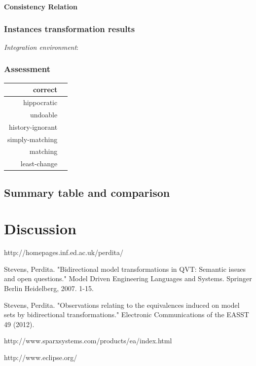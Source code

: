 \documentclass{article}
\begin{document}
\textbf{Consistency Relation}
\subsubsection{Instances transformation results}
\textit{Integration environment}:
~\\


\subsubsection{Assessment}

\begin{center}
\begin{tabular}{| r | c |}
  \hline                        
  correct & \\
  \hline
  hippocratic & \\
  \hline 
  undoable & \\
  \hline 
  history-ignorant & \\
  \hline 
  simply-matching & \\
  \hline 
  matching & \\
  \hline 
  least-change & \\
  \hline   
\end{tabular}
\end{center}
\pagebreak
\subsection{Summary table and comparison}

\pagebreak
\section{Discussion}

\pagebreak
\begin{thebibliography}{1}

http://homepages.inf.ed.ac.uk/perdita/ 

Stevens, Perdita. "Bidirectional model transformations in QVT: Semantic issues and open questions." Model Driven Engineering Languages and Systems. Springer Berlin Heidelberg, 2007. 1-15.

Stevens, Perdita. "Observations relating to the equivalences induced on model sets by bidirectional transformations." Electronic Communications of the EASST 49 (2012).


http://www.sparxsystems.com/products/ea/index.html

http://www.eclipse.org/


\end{thebibliography}
\end{document}
